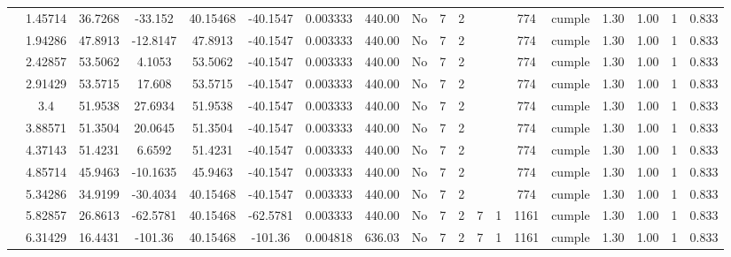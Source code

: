 \begin{table}[H]
{\begin{tabular}{|c|c|c|c|c|c|r|c|c|c|c|c|c|c|c|c|c|c|c|}
\cline{2-19}    & 1.45714 & 36.7268 & -33.152 & 40.15468 & -40.1547 & 0.003333 & 440.00 & No  & 7   & 2   &     &     & 774 & \cellcolor[rgb]{ .776,  .937,  .808}cumple & 1.30 & 1.00 & 1   & 0.833 \bigstrut\\
\cline{2-19}    & 1.94286 & 47.8913 & -12.8147 & 47.8913 & -40.1547 & 0.003333 & 440.00 & No  & 7   & 2   &     &     & 774 & \cellcolor[rgb]{ .776,  .937,  .808}cumple & 1.30 & 1.00 & 1   & 0.833 \bigstrut\\
\cline{2-19}    & 2.42857 & 53.5062 & 4.1053 & 53.5062 & -40.1547 & 0.003333 & 440.00 & No  & 7   & 2   &     &     & 774 & \cellcolor[rgb]{ .776,  .937,  .808}cumple & 1.30 & 1.00 & 1   & 0.833 \bigstrut\\
\cline{2-19}    & 2.91429 & 53.5715 & 17.608 & 53.5715 & -40.1547 & 0.003333 & 440.00 & No  & 7   & 2   &     &     & 774 & \cellcolor[rgb]{ .776,  .937,  .808}cumple & 1.30 & 1.00 & 1   & 0.833 \bigstrut\\
\cline{2-19}    & 3.4 & 51.9538 & 27.6934 & 51.9538 & -40.1547 & 0.003333 & 440.00 & No  & 7   & 2   &     &     & 774 & \cellcolor[rgb]{ .776,  .937,  .808}cumple & 1.30 & 1.00 & 1   & 0.833 \bigstrut\\
\cline{2-19}    & 3.88571 & 51.3504 & 20.0645 & 51.3504 & -40.1547 & 0.003333 & 440.00 & No  & 7   & 2   &     &     & 774 & \cellcolor[rgb]{ .776,  .937,  .808}cumple & 1.30 & 1.00 & 1   & 0.833 \bigstrut\\
\cline{2-19}    & 4.37143 & 51.4231 & 6.6592 & 51.4231 & -40.1547 & 0.003333 & 440.00 & No  & 7   & 2   &     &     & 774 & \cellcolor[rgb]{ .776,  .937,  .808}cumple & 1.30 & 1.00 & 1   & 0.833 \bigstrut\\
\cline{2-19}    & 4.85714 & 45.9463 & -10.1635 & 45.9463 & -40.1547 & 0.003333 & 440.00 & No  & 7   & 2   &     &     & 774 & \cellcolor[rgb]{ .776,  .937,  .808}cumple & 1.30 & 1.00 & 1   & 0.833 \bigstrut\\
\cline{2-19}    & 5.34286 & 34.9199 & -30.4034 & 40.15468 & -40.1547 & 0.003333 & 440.00 & No  & 7   & 2   &     &     & 774 & \cellcolor[rgb]{ .776,  .937,  .808}cumple & 1.30 & 1.00 & 1   & 0.833 \bigstrut\\
\cline{2-19}    & 5.82857 & 26.8613 & -62.5781 & 40.15468 & -62.5781 & 0.003333 & 440.00 & No  & 7   & 2   & 7   & 1   & 1161 & \cellcolor[rgb]{ .776,  .937,  .808}cumple & 1.30 & 1.00 & 1   & 0.833 \bigstrut\\
\cline{2-19}    & 6.31429 & 16.4431 & -101.36 & 40.15468 & -101.36 & 0.004818 & 636.03 & No  & 7   & 2   & 7   & 1   & 1161 & \cellcolor[rgb]{ .776,  .937,  .808}cumple & 1.30 & 1.00 & 1   & 0.833 \bigstrut\\

\end{tabular}}
\end{table}
